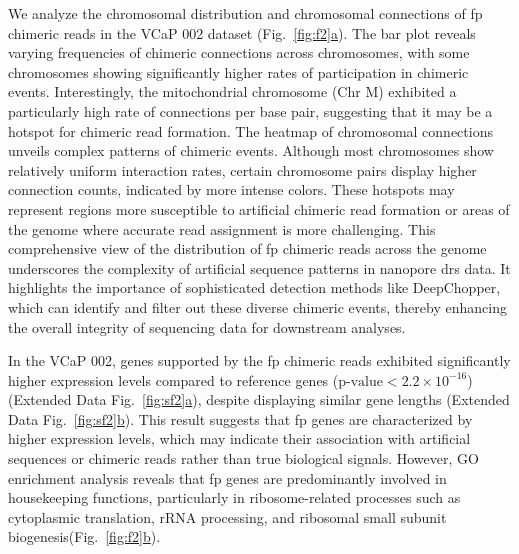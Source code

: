 \documentclass[pdflatex,sn-nature, lineno]{sn-jnl}%
\newcommand{\figref}[2]{Fig.~\hyperref[#1]{\ref*{#1}#2}}
\newcommand{\edfigref}[2]{Extended Data Fig.~\hyperref[#1]{\ref*{#1}#2}}
\theoremstyle{thmstyleone}%
\theoremstyle{thmstyletwo}%
\theoremstyle{thmstylethree}%
\begin{document}
We analyze the chromosomal distribution and chromosomal connections of \gls{fp} chimeric reads in the VCaP 002 dataset (\figref{fig:f2}{a}). 
The bar plot reveals varying frequencies of chimeric connections across chromosomes, with some chromosomes showing significantly higher rates of participation in chimeric events. 
Interestingly, the mitochondrial chromosome (Chr M) exhibited a particularly high rate of connections per base pair, suggesting that it may be a hotspot for chimeric read formation.
The heatmap of chromosomal connections unveils complex patterns of chimeric events. 
Although most chromosomes show relatively uniform interaction rates, certain chromosome pairs display higher connection counts, indicated by more intense colors. 
These hotspots may represent regions more susceptible to artificial chimeric read formation or areas of the genome where accurate read assignment is more challenging.
This comprehensive view of the distribution of \gls{fp} chimeric reads across the genome underscores the complexity of artificial sequence patterns in nanopore \gls{drs} data. 
It highlights the importance of sophisticated detection methods like DeepChopper, which can identify and filter out these diverse chimeric events, thereby enhancing the overall integrity of sequencing data for downstream analyses.

In the VCaP 002, genes supported by the \gls{fp} chimeric reads exhibited significantly higher expression levels compared to reference genes (\(\textrm{p-value} < 2.2 \times 10^{-16}\)) (\edfigref{fig:sf2}{a}), despite displaying similar gene lengths (\edfigref{fig:sf2}{b}).
This result suggests that \gls{fp} genes are characterized by higher expression levels, which may indicate their association with artificial sequences or chimeric reads rather than true biological signals. However, GO enrichment analysis reveals that \gls{fp} genes are predominantly involved in housekeeping functions, particularly in ribosome-related processes such as cytoplasmic translation, rRNA processing, and ribosomal small subunit biogenesis(\figref{fig:f2}{b}).
\end{document}
